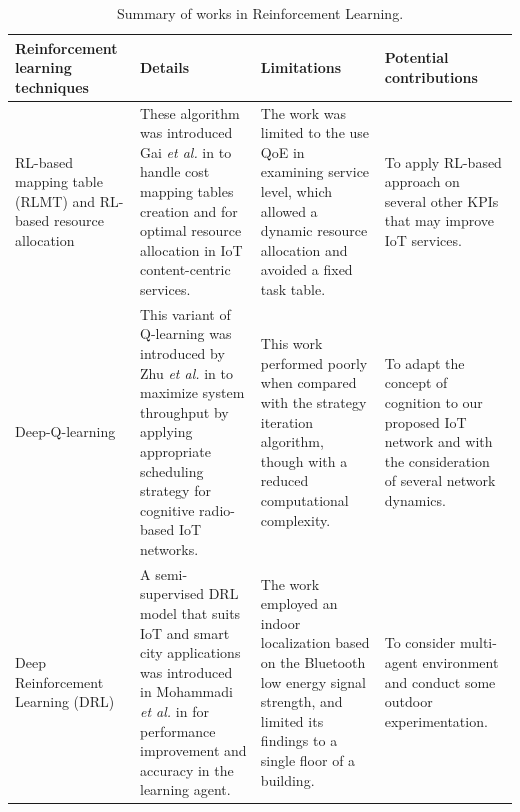 \documentclass[journal]{IEEEtran}
\begin{document}
\pagestyle{empty}
\begin{landscape}



\renewcommand{\arraystretch}{1.2}


\begin{table}
\small
\centering
\caption{Summary of works in Reinforcement Learning.}


\centering

\label{table:review}
\begin{tabular}{llll}


  \hline
    Reinforcement learning techniques & Details  & Limitations & Potential contributions \\
  \hline \hline
  \multicolumn{1}{m{3cm}}{RL-based mapping table (RLMT) and RL-based resource allocation} & \multicolumn{1}{m{6cm}}{These algorithm was introduced Gai \emph{et al.} in \cite{Gai2018} to handle cost mapping tables creation and for optimal resource allocation in IoT content-centric services.} & \multicolumn{1}{m{6cm}}{The work was limited to the use QoE in examining service level, which allowed a dynamic resource allocation and avoided a fixed task table.} & \multicolumn{1}{m{6cm}}{To apply RL-based approach on several other KPIs that may improve IoT services.}\\ \hline

\multicolumn{1}{m{3cm}}{Deep-Q-learning} & \multicolumn{1}{m{6cm}}{This variant of Q-learning was introduced by Zhu \emph{et al.} in \cite{Zhu2018} to maximize system throughput by applying appropriate scheduling strategy for cognitive radio-based IoT networks.} & \multicolumn{1}{m{6cm}}{This work performed poorly when compared with the strategy iteration algorithm, though with a reduced computational complexity.} & \multicolumn{1}{m{6cm}}{To adapt the concept of cognition to our proposed IoT network and with the consideration of several network dynamics.}\\ \hline


\multicolumn{1}{m{3cm}}{Deep Reinforcement Learning (DRL)} & \multicolumn{1}{m{6cm}}{A semi-supervised DRL model that suits IoT and smart city applications was introduced in Mohammadi \emph{et al.} in \cite{Mohammadi2018} for performance improvement and accuracy in the learning agent.} & \multicolumn{1}{m{6cm}}{The work employed an indoor localization based on the Bluetooth low energy signal strength, and limited its findings to a single floor of a building.} & \multicolumn{1}{m{6cm}}{To consider multi-agent environment and conduct some outdoor experimentation.}\\ \hline



\end{tabular}
\end{table}
\end{landscape}
\end{document}
